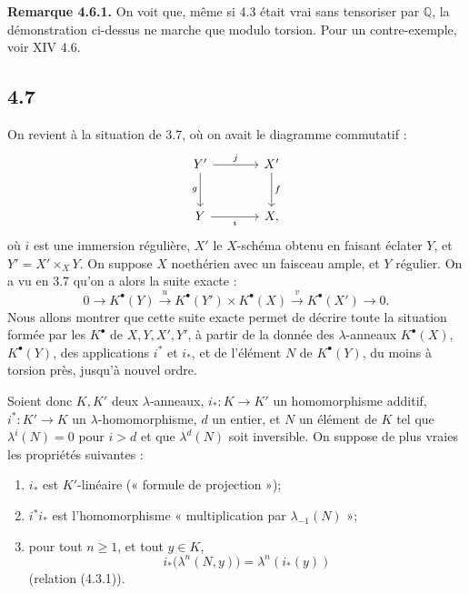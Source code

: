 \documentclass[11pt]{article}
\begin{document}
\textbf{Remarque 4.6.1.} On voit que, même si 4.3 était vrai sans tensoriser par \(\mathbb Q\), la démonstration ci-dessus ne marche que modulo torsion. Pour un contre-exemple, voir XIV 4.6.

\subsection*{4.7}

On revient à la situation de 3.7, où on avait le diagramme commutatif :
\[
\begin{tikzcd}[column sep=large,row sep=large]
Y' \arrow[r,"j"] \arrow[d,"g"'] & X' \arrow[d,"f"]\\
Y \arrow[r,"i"'] & X,
\end{tikzcd}
\]
où \(i\) est une immersion régulière, \(X'\) le \(X\)-schéma obtenu en faisant éclater \(Y\), et \(Y'=X'\times_XY\). On suppose \(X\) noethérien avec un faisceau ample, et \(Y\) régulier. On a vu en 3.7 qu'on a alors la suite exacte :
\[
0\longrightarrow K^\bullet(Y)\xrightarrow{u}
K^\bullet(Y')\times K^\bullet(X)\xrightarrow{v}
K^\bullet(X')\longrightarrow0.
\]
Nous allons montrer que cette suite exacte permet de décrire toute la situation formée par les \(K^\bullet\) de \(X,Y,X',Y'\), à partir de la donnée des \(\lambda\)-anneaux \(K^\bullet(X)\), \(K^\bullet(Y)\), des applications \(i^*\) et \(i_*\), et de l'élément \(N\) de \(K^\bullet(Y)\), du moins à torsion près, jusqu'à nouvel ordre.

Soient donc \(K,K'\) deux \(\lambda\)-anneaux, \(i_*:K\to K'\) un homomorphisme additif, \(i^*:K'\to K\) un \(\lambda\)-homomorphisme, \(d\) un entier, et \(N\) un élément de \(K\) tel que \(\lambda^i(N)=0\) pour \(i>d\) et que \(\lambda^d(N)\) soit inversible. On suppose de plus vraies les propriétés suivantes :
\begin{enumerate}[label=\roman*)]
\item \(i_*\) est \(K'\)-linéaire (« formule de projection »);
\item \(i^*i_*\) est l'homomorphisme « multiplication par \(\lambda_{-1}(N)\) »;
\item pour tout \(n\ge1\), et tout \(y\in K\),
\[
 i_*\bigl(\lambda^n(N,y)\bigr)=\lambda^n(i_*(y))
\]
(relation (4.3.1)).
\end{enumerate}
\end{document}
